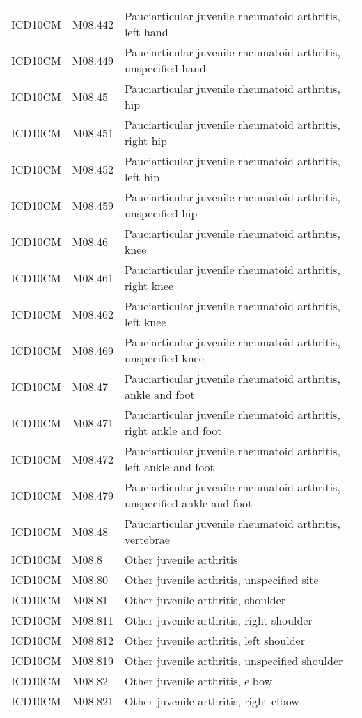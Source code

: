 \begin{table}[ht]
\begin{tabular}{lll}
  ICD10CM & M08.442 & Pauciarticular juvenile rheumatoid arthritis, left hand \\ 
  ICD10CM & M08.449 & Pauciarticular juvenile rheumatoid arthritis, unspecified hand \\ 
  ICD10CM & M08.45 & Pauciarticular juvenile rheumatoid arthritis, hip \\ 
  ICD10CM & M08.451 & Pauciarticular juvenile rheumatoid arthritis, right hip \\ 
  ICD10CM & M08.452 & Pauciarticular juvenile rheumatoid arthritis, left hip \\ 
  ICD10CM & M08.459 & Pauciarticular juvenile rheumatoid arthritis, unspecified hip \\ 
  ICD10CM & M08.46 & Pauciarticular juvenile rheumatoid arthritis, knee \\ 
  ICD10CM & M08.461 & Pauciarticular juvenile rheumatoid arthritis, right knee \\ 
  ICD10CM & M08.462 & Pauciarticular juvenile rheumatoid arthritis, left knee \\ 
  ICD10CM & M08.469 & Pauciarticular juvenile rheumatoid arthritis, unspecified knee \\ 
  ICD10CM & M08.47 & Pauciarticular juvenile rheumatoid arthritis, ankle and foot \\ 
  ICD10CM & M08.471 & Pauciarticular juvenile rheumatoid arthritis, right ankle and foot \\ 
  ICD10CM & M08.472 & Pauciarticular juvenile rheumatoid arthritis, left ankle and foot \\ 
  ICD10CM & M08.479 & Pauciarticular juvenile rheumatoid arthritis, unspecified ankle and foot \\ 
  ICD10CM & M08.48 & Pauciarticular juvenile rheumatoid arthritis, vertebrae \\ 
  ICD10CM & M08.8 & Other juvenile arthritis \\ 
  ICD10CM & M08.80 & Other juvenile arthritis, unspecified site \\ 
  ICD10CM & M08.81 & Other juvenile arthritis, shoulder \\ 
  ICD10CM & M08.811 & Other juvenile arthritis, right shoulder \\ 
  ICD10CM & M08.812 & Other juvenile arthritis, left shoulder \\ 
  ICD10CM & M08.819 & Other juvenile arthritis, unspecified shoulder \\ 
  ICD10CM & M08.82 & Other juvenile arthritis, elbow \\ 
  ICD10CM & M08.821 & Other juvenile arthritis, right elbow \\ 

\end{tabular}
\end{table}
